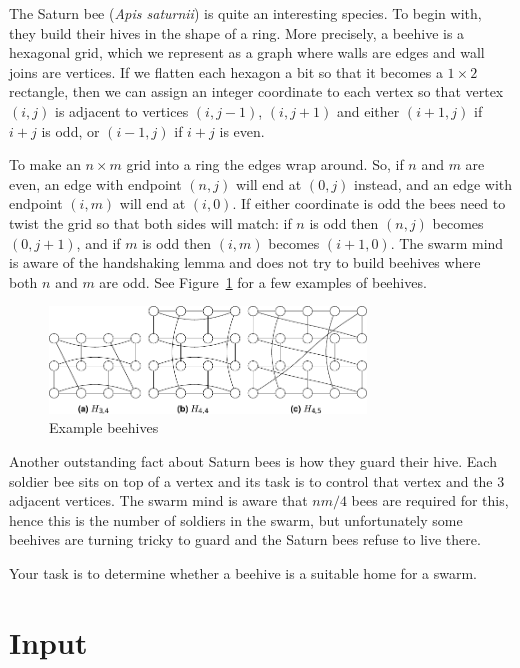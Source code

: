 
%

The Saturn bee (\emph{Apis saturnii}) is quite an interesting
species. To begin with, they build their hives in the shape of a
ring. More precisely, a beehive is a hexagonal grid, which we
represent as a graph where walls are edges and wall joins are
vertices. If we flatten each hexagon a bit so that it becomes a
$1 \times 2$ rectangle, then we can assign an integer coordinate to
each vertex so that vertex $(i,j)$ is adjacent to vertices $(i,j-1)$,
$(i,j+1)$ and either $(i+1,j)$ if $i+j$ is odd, or $(i-1,j)$ if $i+j$
is even.

To make an $n \times m$ grid into a ring the edges wrap around. So, if
$n$ and $m$ are even, an edge with endpoint $(n,j)$ will end at
$(0,j)$ instead, and an edge with endpoint $(i,m)$ will end at
$(i,0)$. If either coordinate is odd the bees need to twist the grid
so that both sides will match: if $n$ is odd then $(n,j)$ becomes
$(0,j+1)$, and if $m$ is odd then $(i,m)$ becomes $(i+1,0)$. The swarm
mind is aware of the handshaking lemma and does not try to build
beehives where both $n$ and $m$ are odd. See Figure~\ref{fig:hex} for
a few examples of beehives.

\begin{figure}[h]
  \centering
    \includegraphics[width=0.75\textwidth]{hex.pdf}
  \caption{Example beehives}
  \label{fig:hex}
\end{figure}

Another outstanding fact about Saturn bees is how they guard their
hive. Each soldier bee sits on top of a vertex and its task is to
control that vertex and the $3$ adjacent vertices. The swarm mind is
aware that $nm/4$ bees are required for this, hence this is the number
of soldiers in the swarm, but unfortunately some beehives are turning
tricky to guard and the Saturn bees refuse to live there.

Your task is to determine whether a beehive is a suitable home for a
swarm.

\section*{Input}

